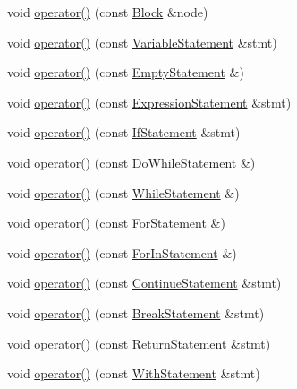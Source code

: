 \begin{DoxyCompactItemize}
\item 
void \hyperlink{struct_basic_visitor_aae1410617eb4cfed77871e4b46a7850c}{operator()} (const \hyperlink{struct_block}{Block} \&node)
\item 
void \hyperlink{struct_basic_visitor_aa31748356438cd46ef7cbc49fb8055fa}{operator()} (const \hyperlink{struct_variable_statement}{Variable\+Statement} \&stmt)
\item 
void \hyperlink{struct_basic_visitor_a210214f50f892e5bdf5b5903b2191ab6}{operator()} (const \hyperlink{struct_empty_statement}{Empty\+Statement} \&)
\item 
void \hyperlink{struct_basic_visitor_ae944edc097bb1bcbd5625fbc81c78d0a}{operator()} (const \hyperlink{struct_expression_statement}{Expression\+Statement} \&stmt)
\item 
void \hyperlink{struct_basic_visitor_a90af1121005cdaadea708cd60cc016fd}{operator()} (const \hyperlink{struct_if_statement}{If\+Statement} \&stmt)
\item 
void \hyperlink{struct_basic_visitor_a7c7caaec50936da8bef52601f1c38d10}{operator()} (const \hyperlink{struct_do_while_statement}{Do\+While\+Statement} \&)
\item 
void \hyperlink{struct_basic_visitor_adc70983c2617c6a99fe00e2178af6e14}{operator()} (const \hyperlink{struct_while_statement}{While\+Statement} \&)
\item 
void \hyperlink{struct_basic_visitor_a6a973ae3d27c06462637d6ddf5f5d9f1}{operator()} (const \hyperlink{struct_for_statement}{For\+Statement} \&)
\item 
void \hyperlink{struct_basic_visitor_a065fa15042daac02f409f3548cc2f687}{operator()} (const \hyperlink{struct_for_in_statement}{For\+In\+Statement} \&)
\item 
void \hyperlink{struct_basic_visitor_a58a6a60b11a58e0f545c818ad7e5ad9f}{operator()} (const \hyperlink{struct_continue_statement}{Continue\+Statement} \&stmt)
\item 
void \hyperlink{struct_basic_visitor_a9ee1441f235f852663d61203034e788b}{operator()} (const \hyperlink{struct_break_statement}{Break\+Statement} \&stmt)
\item 
void \hyperlink{struct_basic_visitor_a367cfaf0409162f7c94e1648e625816e}{operator()} (const \hyperlink{struct_return_statement}{Return\+Statement} \&stmt)
\item 
void \hyperlink{struct_basic_visitor_adef187cc02193116879f4697488ddabf}{operator()} (const \hyperlink{struct_with_statement}{With\+Statement} \&stmt)
\item 

\end{DoxyCompactItemize}
